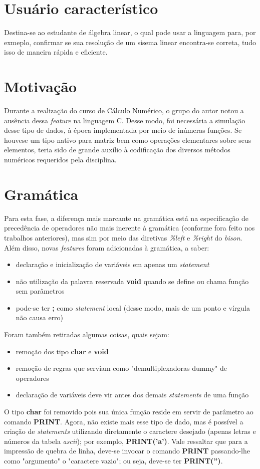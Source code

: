 \documentclass[
	article,			%
	11pt,				%
	oneside,			%
	a4paper,			%
	english,			%
	brazil,				%
	sumario=tradicional
	]{abntex2}
\renewcommand{\it}[1]{\textit{#1}}
\renewcommand{\bf}[1]{\textbf{#1}}
\begin{document}
\section{Usuário característico}
Destina-se ao estudante de álgebra linear, o qual pode usar a linguagem para, por exmeplo, confirmar se sua resolução de um sisema linear encontra-se correta, tudo isso de maneira rápida e eficiente.

\section{Motivação}
Durante a realização do curso de Cálculo Numérico, o grupo do autor notou a ausência dessa \it{feature} na linguagem C. Desse modo, foi necessária a simulação desse tipo de dados, à época implementada por meio de inúmeras funções. Se houvese um tipo nativo para matriz bem como operações elementares sobre seus elementos, teria sido de grande auxílio à codificação dos diversos métodos numéricos requeridos pela disciplina.
\par


\section{Gramática}

Para esta fase, a diferença mais marcante na gramática está na especificação de precedência de operadores não mais inerente à gramática (conforme fora feito nos trabalhos anteriores), mas sim por meio das diretivas \it{\%left} e \it{\%right} do \it{bison}. Além disso, novas \it{features} foram adicionadas à gramática, a saber:
\begin{itemize}
	\item declaração e inicialização de variáveis em apenas um \it{statement}
	\item não utilização da palavra reservada \bf{void} quando se define ou chama função sem parâmetros
	\item pode-se ter \bf{;} como \it{statement} local (desse modo, mais de um ponto e vírgula não causa erro)	
\end{itemize}
Foram também retiradas algumas coisas, quais sejam:
\begin{itemize}
	\item remoção dos tipo \bf{char} e \bf{void}
	\item remoção de regras que serviam como "demultiplexadoras dummy"  de operadores
	\item declaração de variáveis deve vir antes dos demais \it{statements} de uma função
\end{itemize}
O tipo \bf{char} foi removido pois sua única função reside em servir de parâmetro ao comando \bf{PRINT}. Agora, não existe mais esse tipo de dado, mas é possível a criação de \it{statements} utilizando diretamente o caractere desejado (apenas letras e números da tabela \it{ascii}); por exemplo, \bf{PRINT('a')}. Vale ressaltar que para a impressão de quebra de linha, deve-se invocar o comando \bf{PRINT} passando-lhe como "argumento"  o "caractere vazio"; ou seja, deve-se 
ter \bf{PRINT('')}.
\end{document}
